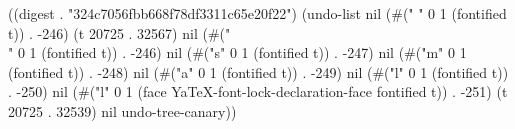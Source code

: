 
((digest . "324c7056fbb668f78df3311c65e20f22") (undo-list nil (#(" " 0 1 (fontified t)) . -246) (t 20725 . 32567) nil (#("\\" 0 1 (fontified t)) . -246) nil (#("s" 0 1 (fontified t)) . -247) nil (#("m" 0 1 (fontified t)) . -248) nil (#("a" 0 1 (fontified t)) . -249) nil (#("l" 0 1 (fontified t)) . -250) nil (#("l" 0 1 (face YaTeX-font-lock-declaration-face fontified t)) . -251) (t 20725 . 32539) nil undo-tree-canary))
